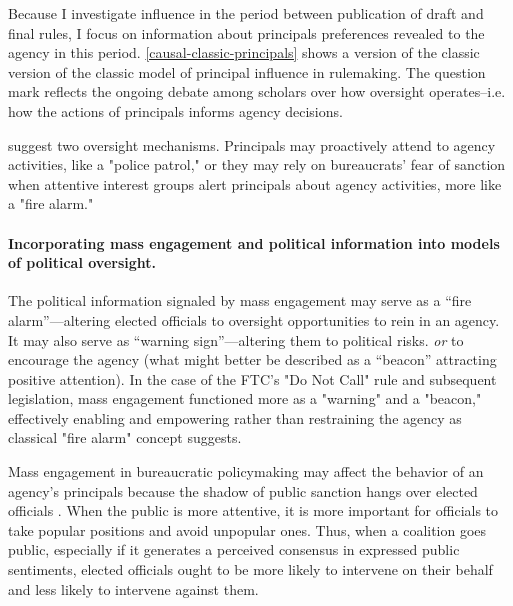 Because I investigate influence in the period between publication of  draft and final rules, I focus on information about principals preferences revealed to the agency in this period. \ref{causal-classic-principals} shows a version of the classic version of the classic model of principal influence in rulemaking. The question mark reflects the ongoing debate among scholars over how oversight operates--i.e. how the actions of principals informs agency decisions. 



\citet{McCubbins1987} suggest two oversight mechanisms. Principals may proactively attend to agency activities, like a "police patrol," or they may rely on bureaucrats' fear of sanction when attentive interest groups alert principals about agency activities, more like a "fire alarm." 



\paragraph{Incorporating mass engagement and political information into models of political oversight.}

The political information signaled by mass engagement may serve as a ``fire alarm''---altering elected officials to oversight opportunities to rein in an agency. It may also serve as ``warning sign''---altering them to political risks.
\emph{or} to encourage the agency (what might better be described as a ``beacon'' attracting positive attention). In the case of the FTC's "Do Not Call" rule and subsequent legislation, mass engagement functioned more as a "warning" and a "beacon," effectively enabling and empowering rather than restraining the agency as classical "fire alarm" concept suggests.

Mass engagement in bureaucratic policymaking may affect the behavior of an agency's principals because the shadow of public sanction hangs over elected officials \citep{Arnold1979, Mayhew2000}. When the public is more attentive, it is more important for officials to take popular positions and avoid unpopular ones.
Thus, when a coalition goes public, especially if it generates a perceived consensus in expressed public sentiments, elected officials ought to be more likely to intervene on their behalf and less likely to intervene against them.  

